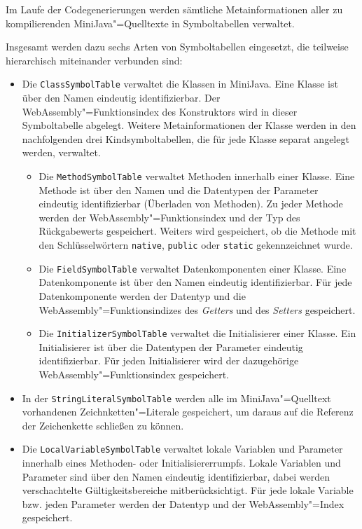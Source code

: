 Im Laufe der Codegenerierungen werden sämtliche Metainformationen aller zu kompilierenden MiniJava"=Quelltexte in Symboltabellen verwaltet.

Insgesamt werden dazu sechs Arten von Symboltabellen eingesetzt, die teilweise hierarchisch miteinander verbunden sind:
\begin{itemize}
    \item Die \lstinline{ClassSymbolTable} verwaltet die Klassen in MiniJava. Eine Klasse ist über den Namen eindeutig identifizierbar. Der WebAssembly"=Funktionsindex des Konstruktors wird in dieser Symboltabelle abgelegt. Weitere Metainformationen der Klasse werden in den nachfolgenden drei Kindsymboltabellen, die für jede Klasse separat angelegt werden, verwaltet.
    \begin{itemize}
        \item Die \lstinline{MethodSymbolTable} verwaltet Methoden innerhalb einer Klasse. Eine Methode ist über den Namen und die Datentypen der Parameter eindeutig identifizierbar (Überladen von Methoden). Zu jeder Methode werden der WebAssembly"=Funktionsindex und der Typ des Rückgabewerts gespeichert. Weiters wird gespeichert, ob die Methode mit den Schlüsselwörtern \lstinline{native}, \lstinline{public} oder \lstinline{static}  gekennzeichnet wurde.
        \item Die \lstinline{FieldSymbolTable} verwaltet Datenkomponenten einer Klasse. Eine Datenkomponente ist über den Namen eindeutig identifizierbar. Für jede Datenkomponente werden der Datentyp und die WebAssembly"=Funktionsindizes des \emph{Getters} und des \emph{Setters} gespeichert.
        \item Die \lstinline{InitializerSymbolTable} verwaltet die Initialisierer einer Klasse. Ein Initialisierer ist über die Datentypen der Parameter eindeutig identifizierbar. Für jeden Initialisierer wird der dazugehörige WebAssembly"=Funktionsindex gespeichert.
    \end{itemize}
    \item In der \lstinline{StringLiteralSymbolTable} werden alle im MiniJava"=Quelltext vorhandenen Zeichnketten"=Literale gespeichert, um daraus auf die Referenz der Zeichenkette schließen zu können.
    \item Die \lstinline{LocalVariableSymbolTable} verwaltet lokale Variablen und Parameter innerhalb eines Methoden- oder Initialisiererrumpfs. Lokale Variablen und Parameter sind über den Namen eindeutig identifizierbar, dabei werden verschachtelte Gültigkeitsbereiche mitberücksichtigt. Für jede lokale Variable bzw. jeden Parameter werden der Datentyp und der WebAssembly"=Index gespeichert.
\end{itemize}

